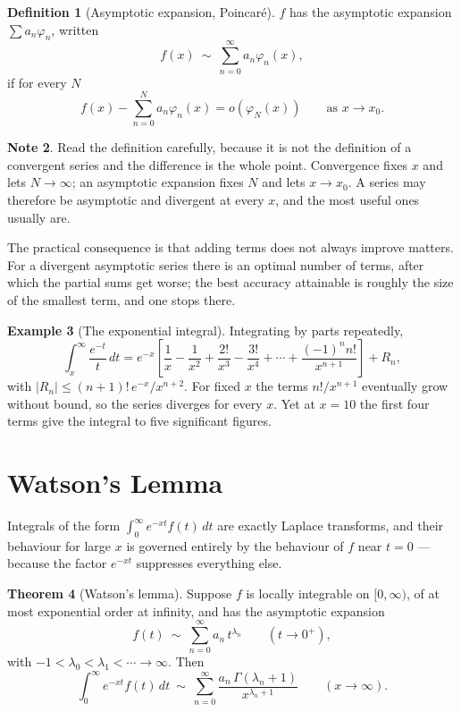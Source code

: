\documentclass[12pt,a4paper]{report}
\theoremstyle{definition}
\newtheorem{thm}{Theorem}[section]
\newtheorem{defn}[thm]{Definition}
\newtheorem{exa}[thm]{Example}
\newtheorem{note}[thm]{Note}
\theoremstyle{plain}
\begin{document}
\begin{defn}[Asymptotic expansion, Poincar\'e]
$f$ has the asymptotic expansion $\sum a_n\varphi_n$, written
$$f(x)\ \sim\ \sum^{\infty}_{n=0}a_n\varphi_n(x),$$
if for every $N$
$$f(x) - \sum^{N}_{n=0}a_n\varphi_n(x) = o\left(\varphi_N(x)\right)
\qquad\text{as } x\to x_0 .$$
\end{defn}

\begin{note}
Read the definition carefully, because it is not the definition of a convergent
series and the difference is the whole point. Convergence fixes $x$ and lets
$N\to\infty$; an asymptotic expansion fixes $N$ and lets $x\to x_0$. A series
may therefore be asymptotic and divergent at every $x$, and the most useful ones
usually are.

The practical consequence is that adding terms does not always improve matters.
For a divergent asymptotic series there is an optimal number of terms, after
which the partial sums get worse; the best accuracy attainable is roughly the
size of the smallest term, and one stops there.
\end{note}

\begin{exa}[The exponential integral]
\label{exa:expint}
Integrating by parts repeatedly,
$$\int^{\infty}_{x}\frac{e^{-t}}{t}\,dt
= e^{-x}\left[\frac{1}{x} - \frac{1}{x^{2}} + \frac{2!}{x^{3}}
- \frac{3!}{x^{4}} + \cdots + \frac{(-1)^{n}n!}{x^{n+1}}\right] + R_n,$$
with $\left|R_n\right| \leq (n+1)!\,e^{-x}/x^{n+2}$. For fixed $x$ the terms
$n!/x^{n+1}$ eventually grow without bound, so the series diverges for every
$x$. Yet at $x=10$ the first four terms give the integral to five significant
figures.
\end{exa}

\section{Watson's Lemma}

Integrals of the form $\int^{\infty}_{0}e^{-xt}f(t)\,dt$ are exactly Laplace
transforms, and their behaviour for large $x$ is governed entirely by the
behaviour of $f$ near $t=0$ --- because the factor $e^{-xt}$ suppresses
everything else.

\begin{thm}[Watson's lemma]
\label{thm:watson}
Suppose $f$ is locally integrable on $[0,\infty)$, of at most exponential order
at infinity, and has the asymptotic expansion
$$f(t)\ \sim\ \sum^{\infty}_{n=0}a_n\,t^{\lambda_n}
\qquad (t\to0^{+}),$$
with $-1<\lambda_0<\lambda_1<\cdots\to\infty$. Then
$$\int^{\infty}_{0}e^{-xt}f(t)\,dt
\ \sim\ \sum^{\infty}_{n=0}\frac{a_n\,\Gamma\left(\lambda_n+1\right)}
{x^{\lambda_n+1}}
\qquad (x\to\infty).$$
\end{thm}
\end{document}
